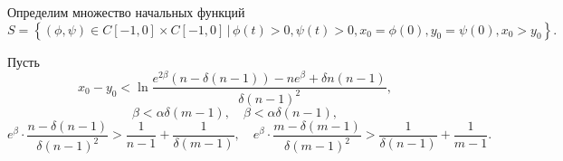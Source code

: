 Определим множество начальных функций
\begin{equation}
	\label{eq:initial_set}
	S = \left\{(\phi, \psi) \in C[-1, 0] \times C[-1, 0] \,|\, \phi(t) > 0, \psi(t) > 0, x_0 = \phi(0), y_0 = \psi(0), x_0 > y_0\right\}.
\end{equation}

\begin{theorem}
	\label{thm:relay_solution}
	Пусть 
	\begin{equation}
		\label{eq:constraint_1}
		x_0 - y_0 < \ln \dfrac{e^{2\beta}(n - \delta(n - 1)) - ne^{\beta} + \delta n(n - 1)}{\delta (n - 1)^2},
	\end{equation}
	\begin{equation}
		\label{eq:constraint_2}
		\beta < \alpha \delta (m - 1), \quad \beta < \alpha \delta (n - 1),
	\end{equation}
	\begin{equation}
		\label{eq:constraint_3}
		e^{\beta} \cdot \dfrac{n - \delta(n - 1)}{\delta (n - 1)^2} > \dfrac{1}{n - 1} + \dfrac{1}{\delta(m - 1)}, \quad
		e^{\beta} \cdot \dfrac{m - \delta(m - 1)}{\delta (m - 1)^2} > \dfrac{1}{\delta(n - 1)} + \dfrac{1}{m - 1}.
	\end{equation}
	

\end{theorem}
